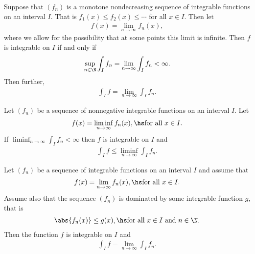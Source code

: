 \documentclass{article}
\begin{document}
\begin{theorem}
    Suppose that $(f_n)$ is a monotone nondecreasing sequence of integrable functions on an interval $I$. That is
    $f_1(x) \leq f_2(x) \leq \cdots$ for all $x\in I$. Then let
    \begin{align*}
        f(x) = \lim_{n\to\infty}f_n(x),
    \end{align*}
    where we allow for the possibility that at some points this limit is infinite. Then $f$ is integrable on $I$
    if and only if
    \begin{align*}
        \sup_{n\in\N}\int_I f_n = \lim_{n\to\infty}\int_I f_n < \infty.
    \end{align*}
    Then further,
    \begin{align*}
        \int_I f = \lim_{n\to\infty} \int_I f_n.
    \end{align*}
\end{theorem}

\begin{lemma}
    Let $(f_n)$ be a sequence of nonnegative integrable functions on an interval $I$. Let
    \begin{align*}
        f(x) = \liminf_{n\to\infty} f_n(x), \hs\text{for all $x\in I$}.
    \end{align*}
    If $\liminf_{n\to\infty}\int_I f_n<\infty$ then $f$ is integrable on $I$ and
    \begin{align*}
        \int_I f \leq \liminf_{n\to\infty} \int_I f_n.
    \end{align*}
\end{lemma}

\begin{theorem}
    Let $(f_n)$ be a sequence of integrable functions on an interval $I$ and assume that
    \begin{align*}
        f(x) = \lim_{n\to\infty} f_n(x), \hs \text{for all $x\in I$}.
    \end{align*}
    Assume also that the sequence $(f_n)$ is dominated by some integrable function $g$, that is
    \begin{align*}
        \abs{f_n(x)} \leq g(x), \hs \text{for all $x\in I$ and $n\in\N$.}
    \end{align*}
    Then the function $f$ is integrable on $I$ and
    \begin{align*}
        \int_I f = \lim_{n\to\infty} \int_I f_n.
    \end{align*}
\end{theorem}
\end{document}
